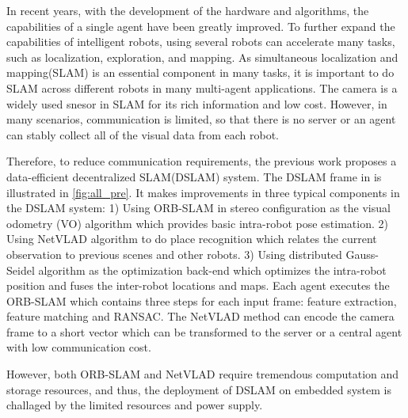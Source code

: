 \label{sec:introdutction}
In recent years, with the development of the hardware and algorithms, the capabilities of a single agent have been greatly improved.
To further expand the capabilities of intelligent robots, using several robots can accelerate many tasks, such as localization, exploration, and mapping.
As simultaneous localization and mapping(SLAM) is an essential component in many tasks, it is important to do SLAM across different robots in many multi-agent applications. 
The camera is a widely used snesor in SLAM for its rich information and low cost. 
However, in many scenarios, communication is limited, so that there is no server or an agent can stably collect all of the visual data from each robot.

Therefore, to reduce communication requirements, the previous work \cite{Cieslewski:20187ee} proposes a data-efficient decentralized SLAM(DSLAM) system. 
The DSLAM frame in \cite{Cieslewski:20187ee} is illustrated in \cref{fig:all_pre}.
It makes improvements in three typical components in the DSLAM system: 1) Using ORB-SLAM \cite{orbslam} in stereo configuration as the visual odometry (VO) algorithm which provides basic intra-robot pose estimation. 2) Using NetVLAD \cite{Arandjelovic:2017997} algorithm to do place recognition which relates the current observation to previous scenes and other robots. 3) Using distributed Gauss-Seidel algorithm \cite{parallel_distributed} as the optimization back-end which optimizes the intra-robot position and fuses the inter-robot locations and maps. Each agent executes the ORB-SLAM which contains three steps for each input frame: feature extraction, feature matching and RANSAC. The NetVLAD method can encode the camera frame to a short vector which can be transformed to the server or a central agent with low communication cost.

However, both ORB-SLAM and NetVLAD require tremendous computation and storage resources, and thus, the deployment of DSLAM on embedded system is challaged by the limited resources and power supply.


